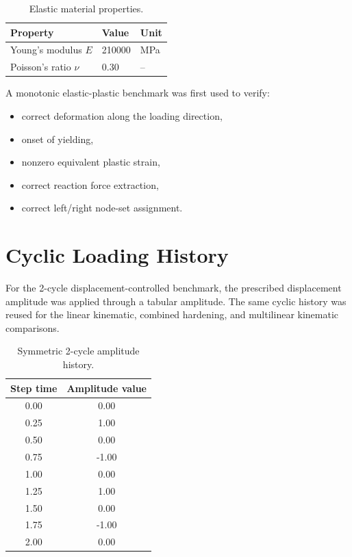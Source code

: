 \documentclass[11pt,a4paper]{article}
\begin{document}
\begin{table}[H]
\centering
\caption{Elastic material properties.}
\begin{tabular}{lll}
\toprule
Property & Value & Unit \\
\midrule
Young's modulus $E$ & 210000 & MPa \\
Poisson's ratio $\nu$ & 0.30 & -- \\
\bottomrule
\end{tabular}
\end{table}

A monotonic elastic-plastic benchmark was first used to verify:
\begin{itemize}
    \item correct deformation along the loading direction,
    \item onset of yielding,
    \item nonzero equivalent plastic strain,
    \item correct reaction force extraction,
    \item correct left/right node-set assignment.
\end{itemize}

\section{Cyclic Loading History}

For the 2-cycle displacement-controlled benchmark, the prescribed displacement amplitude was applied through a tabular amplitude. The same cyclic history was reused for the linear kinematic, combined hardening, and multilinear kinematic comparisons.

\begin{table}[H]
\centering
\caption{Symmetric 2-cycle amplitude history.}
\begin{tabular}{cc}
\toprule
Step time & Amplitude value \\
\midrule
0.00 & 0.00 \\
0.25 & 1.00 \\
0.50 & 0.00 \\
0.75 & -1.00 \\
1.00 & 0.00 \\
1.25 & 1.00 \\
1.50 & 0.00 \\
1.75 & -1.00 \\
2.00 & 0.00 \\
\bottomrule
\end{tabular}
\end{table}
\end{document}
